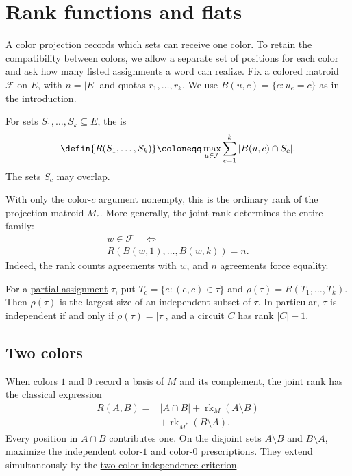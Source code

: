
\section[jointRank]{Rank functions and flats}

A color projection records which sets can receive one color. To retain
the compatibility between colors, we allow a separate set of positions
for each color and ask how many listed assignments a word can realize.
Fix a colored matroid $\mathcal F$ on $E$, with $n=|E|$ and quotas
$r_1,\dotsc,r_k$. We use $B(u,c)=\{e:u_e=c\}$ as in the
\href{intro.htm#coloredMatroids}{introduction}.

\begin{definition}
For sets $S_1,\dotsc,S_k\subseteq E$, the  is
\[
 \defin{R(S_1,\dotsc,S_k)}\coloneqq
 \max_{u\in\mathcal F}\sum_{c=1}^k|B(u,c)\cap S_c|.
\]
The sets $S_c$ may overlap.
\end{definition}

With only the color-$c$ argument nonempty, this is the ordinary rank
of the projection matroid $M_c$. More generally, the joint rank
determines the entire family:
\[
 \begin{gathered}
 w\in\mathcal F\quad\Longleftrightarrow\\
 R(B(w,1),\dotsc,B(w,k))=n.
 \end{gathered}
\]
Indeed, the rank counts agreements with $w$, and $n$ agreements force
equality.

For a \href{independence.htm#independenceAndCircuits}{partial assignment}
$\tau$, put $T_c=\{e:(e,c)\in\tau\}$ and
$\rho(\tau)=R(T_1,\dotsc,T_k)$. Then $\rho(\tau)$ is the largest size
of an independent subset of $\tau$. In particular, $\tau$ is independent
if and only if $\rho(\tau)=|\tau|$, and a circuit $C$ has rank $|C|-1$.

\subsection[twoColorRank]{Two colors}

When colors $1$ and $0$ record a basis of $M$ and its complement,
the joint rank has the classical expression
\[
 \begin{aligned}
 R(A,B)={}&|A\cap B|+\operatorname{rk}_M(A\setminus B)\\
 &+\operatorname{rk}_{M^*}(B\setminus A).
 \end{aligned}
\]
Every position in $A\cap B$ contributes one. On the disjoint sets
$A\setminus B$ and $B\setminus A$, maximize the independent color-$1$
and color-$0$ prescriptions. They extend simultaneously by the
\href{independence.htm#twoColorIndependence}{two-color independence
criterion}.

